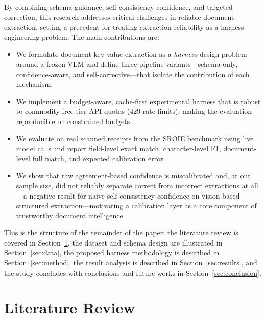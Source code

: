 \documentclass[conference]{IEEEtran}
\begin{document}
By combining schema guidance, self-consistency confidence, and targeted correction, this research addresses critical challenges in reliable document extraction, setting a precedent for treating extraction reliability as a harness-engineering problem. The main contributions are:

\begin{itemize}
    \item We formulate document key-value extraction as a \emph{harness} design problem around a frozen VLM and define three pipeline variants---schema-only, confidence-aware, and self-corrective---that isolate the contribution of each mechanism.
    \item We implement a budget-aware, cache-first experimental harness that is robust to commodity free-tier API quotas (429 rate limits), making the evaluation reproducible on constrained budgets.
    \item We evaluate on real scanned receipts from the SROIE benchmark using live model calls and report field-level exact match, character-level F1, document-level full match, and expected calibration error.
    \item We show that raw agreement-based confidence is miscalibrated and, at our sample size, did not reliably separate correct from incorrect extractions at all---a negative result for naive self-consistency confidence on vision-based structured extraction---motivating a calibration layer as a core component of trustworthy document intelligence.
\end{itemize}

This is the structure of the remainder of the paper: the literature review is covered in Section~\ref{sec:lit}, the dataset and schema design are illustrated in Section~\ref{sec:data}, the proposed harness methodology is described in Section~\ref{sec:method}, the result analysis is described in Section~\ref{sec:results}, and the study concludes with conclusions and future works in Section~\ref{sec:conclusion}.

\section{Literature Review}
\label{sec:lit}
\end{document}
